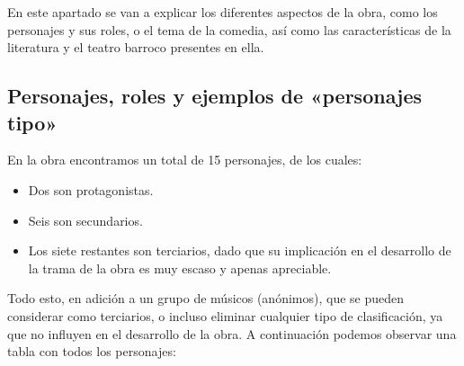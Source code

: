 \documentclass[12pt,a4paper]{article}
\begin{document}
En este apartado se van a explicar los diferentes aspectos de la obra, como los personajes y sus roles, o el tema de la comedia, así como las características de la literatura y el teatro barroco presentes en ella.

\subsection{Personajes, roles y ejemplos de «personajes tipo»}

En la obra encontramos un total de 15 personajes, de los cuales:
\begin{itemize}
	\item Dos son protagonistas.
	\item Seis son secundarios.
	\item Los siete restantes son terciarios, dado que su implicación en el desarrollo de la trama de la obra es muy escaso y apenas apreciable.
\end{itemize}

Todo esto, en adición a un grupo de músicos (anónimos), que se pueden considerar como terciarios, o incluso eliminar cualquier tipo de clasificación, ya que no influyen en el desarrollo de la obra. A continuación podemos observar una tabla con todos los personajes:
\end{document}
